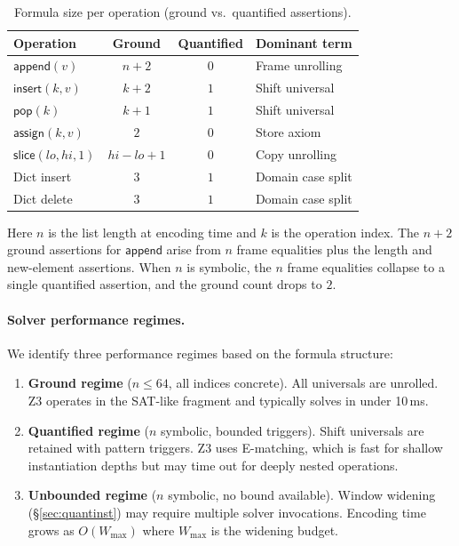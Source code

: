 \documentclass[11pt]{article}
\newcommand{\MutApp}{\ensuremath{\mathsf{append}}}
\newcommand{\MutIns}{\ensuremath{\mathsf{insert}}}
\newcommand{\MutPop}{\ensuremath{\mathsf{pop}}}
\newcommand{\MutSlice}{\ensuremath{\mathsf{slice}}}
\newcommand{\MutAssign}{\ensuremath{\mathsf{assign}}}
\begin{document}
\begin{table}[H]
\centering
\caption{Formula size per operation (ground vs.\ quantified assertions).}
\label{tab:formulasize}
\begin{tabular}{lccl}
\toprule
Operation & Ground & Quantified & Dominant term\\
\midrule
$\MutApp(v)$        & $n + 2$  & $0$ & Frame unrolling \\
$\MutIns(k,v)$      & $k + 2$  & $1$ & Shift universal \\
$\MutPop(k)$        & $k + 1$  & $1$ & Shift universal \\
$\MutAssign(k,v)$   & $2$      & $0$ & Store axiom \\
$\MutSlice(lo,hi,1)$ & $hi-lo+1$ & $0$ & Copy unrolling \\
Dict insert         & $3$      & $1$ & Domain case split \\
Dict delete         & $3$      & $1$ & Domain case split \\
\bottomrule
\end{tabular}
\end{table}

\noindent
Here $n$ is the list length at encoding time and $k$ is the operation index.
The $n + 2$ ground assertions for \MutApp{} arise from $n$ frame equalities
plus the length and new-element assertions.  When $n$ is symbolic, the $n$
frame equalities collapse to a single quantified assertion, and the ground
count drops to $2$.

\paragraph{Solver performance regimes.}
We identify three performance regimes based on the formula structure:

\begin{enumerate}[label=(\roman*),nosep]
  \item \textbf{Ground regime} ($n \leq 64$, all indices concrete).
        All universals are unrolled.  Z3 operates in the SAT-like
        \QFLIA{} fragment and typically solves in under 10\,ms.
  \item \textbf{Quantified regime} ($n$ symbolic, bounded triggers).
        Shift universals are retained with pattern triggers.  Z3 uses
        E-matching, which is fast for shallow instantiation depths but
        may time out for deeply nested operations.
  \item \textbf{Unbounded regime} ($n$ symbolic, no bound available).
        Window widening (\S\ref{sec:quantinst}) may require multiple
        solver invocations.  Encoding time grows as $O(W_{\max})$
        where $W_{\max}$ is the widening budget.
\end{enumerate}
\end{document}
